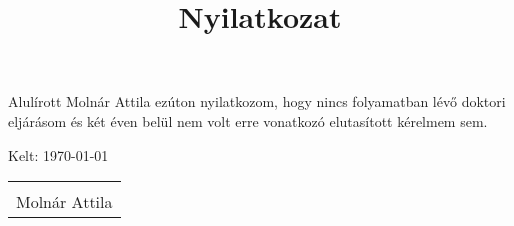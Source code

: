 \documentclass[12pt, a4paper]{article}
\title{Nyilatkozat}
\author{    }
\date{}
\begin{document}
\maketitle
\thispagestyle{empty}
Alulírott Molnár Attila ezúton nyilatkozom, hogy nincs folyamatban lévő doktori eljárásom és két éven belül nem volt erre vonatkozó elutasított kérelmem sem.

\vspace{3cm}

Kelt: \today \hfill \begin{tabular}{c}
\underline{\hspace{5cm}}
\\[1em]
Molnár Attila
\end{tabular}
\maketitle
\end{document}
